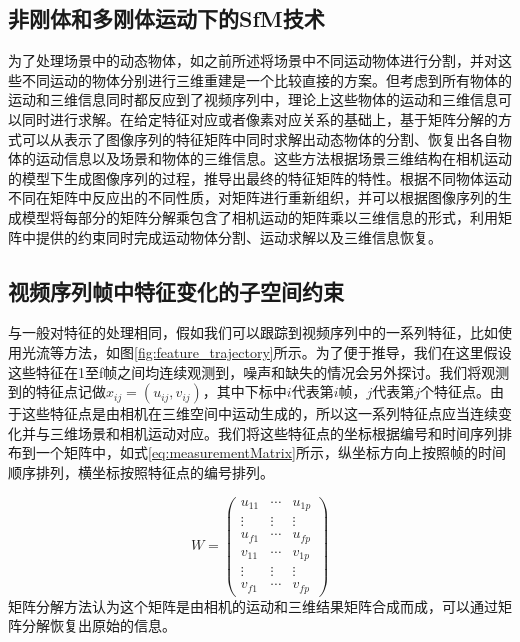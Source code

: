 

\subsection{非刚体和多刚体运动下的SfM技术}
\label{subsec:non-rigid_SfM}
为了处理场景中的动态物体，如之前所述将场景中不同运动物体进行分割，并对这些不同运动的物体分别进行三维重建是一个比较直接的方案。但考虑到所有物体的运动和三维信息同时都反应到了视频序列中，理论上这些物体的运动和三维信息可以同时进行求解\cite{Tomasi1992Shape}。在给定特征对应或者像素对应关系的基础上，基于矩阵分解的方式可以从表示了图像序列的特征矩阵中同时求解出动态物体的分割、恢复出各自物体的运动信息以及场景和物体的三维信息。这些方法根据场景三维结构在相机运动的模型下生成图像序列的过程，推导出最终的特征矩阵的特性。根据不同物体运动不同在矩阵中反应出的不同性质，对矩阵进行重新组织，并可以根据图像序列的生成模型将每部分的矩阵分解乘包含了相机运动的矩阵乘以三维信息的形式，利用矩阵中提供的约束同时完成运动物体分割、运动求解以及三维信息恢复。

\subsection{视频序列帧中特征变化的子空间约束}\label{subsec:subspace}
与一般对特征的处理相同，假如我们可以跟踪到视频序列中的一系列特征，比如使用光流等方法\cite{Fanani2016Keypoint}，如图\ref{fig:feature_trajectory}所示。为了便于推导，我们在这里假设这些特征在1至f帧之间均连续观测到，噪声和缺失的情况会另外探讨。我们将观测到的特征点记做$x_{ij}=(u_{ij},v_{ij})$，其中下标中$i$代表第$i$帧，$j$代表第$j$个特征点。由于这些特征点是由相机在三维空间中运动生成的，所以这一系列特征点应当连续变化并与三维场景和相机运动对应。我们将这些特征点的坐标根据编号和时间序列排布到一个矩阵中，如式\eqref{eq:measurementMatrix}所示，纵坐标方向上按照帧的时间顺序排列，横坐标按照特征点的编号排列。

\begin{equation}\label{eq:measurementMatrix}
W=
\begin{pmatrix}
u_{11}& \cdots & u_{1p}\\
\vdots& \vdots &\vdots\\
u_{f1}& \cdots & u_{fp}\\
v_{11}& \cdots & v_{1p}\\
\vdots& \vdots &\vdots\\
v_{f1}& \cdots & v_{fp}
\end{pmatrix}
\end{equation}
矩阵分解方法认为这个矩阵是由相机的运动和三维结果矩阵合成而成，可以通过矩阵分解恢复出原始的信息。

